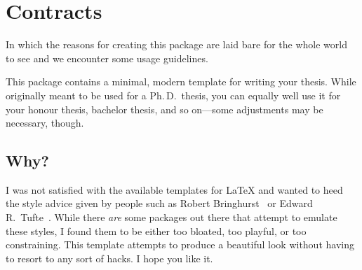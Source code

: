 \chapter{Contracts}

\begin{center}
  \begin{minipage}{0.5\textwidth}
    \begin{small}
      In which the reasons for creating this package are laid bare for the
      whole world to see and we encounter some usage guidelines.
    \end{small}
  \end{minipage}
  \vspace{0.5cm}
\end{center}

\noindent This package contains a minimal, modern template for writing your
thesis. While originally meant to be used for a Ph.\,D.\ thesis, you can
equally well use it for your honour thesis, bachelor thesis, and so
on---some adjustments may be necessary, though.

\section{Why?}

I was not satisfied with the available templates for \LaTeX{} and wanted
to heed the style advice given by people such as Robert
Bringhurst~\cite{Bringhurst12} or Edward R.\
Tufte~\cite{Tufte90,Tufte01}. While there \emph{are} some packages out
there that attempt to emulate these styles, I found them to be either
too bloated, too playful, or too constraining. This template attempts to
produce a beautiful look without having to resort to any sort of hacks.
I hope you like it.
